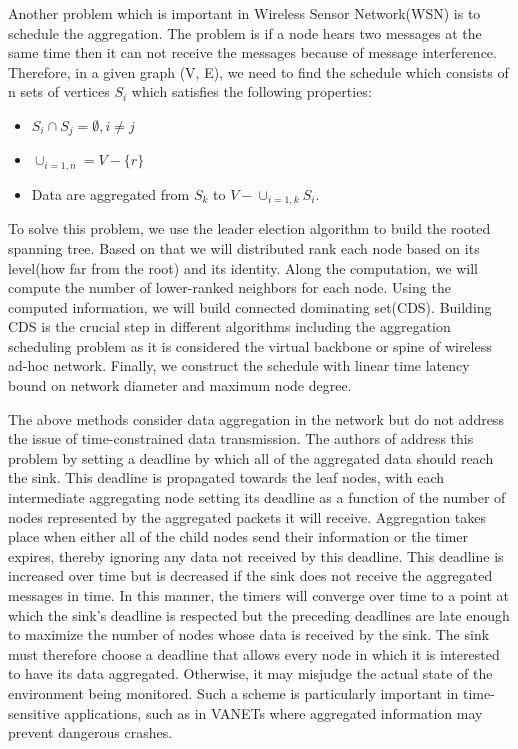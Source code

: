 \documentclass{IEEEtran}
\begin{document}
Another problem which is important in Wireless Sensor Network(WSN) is to schedule the aggregation\cite{DDAS}. The problem is if a node hears two messages at the same time then it can not receive the messages because of message interference. Therefore, in a given graph (V, E), we need to find the schedule which consists of n sets of vertices $S_i$ which satisfies the following properties:
\begin{itemize}
\item $S_i \cap S_j = \emptyset, i \neq j$
\item $\cup_{i=1,n} = V - \{r\}$
\item Data are aggregated from $S_k$ to $V - \cup_{i=1,k}S_i$.
\end{itemize}
To solve this problem, we use the leader election \cite{LeaderElection} algorithm to build the rooted spanning tree. Based on that we will distributed rank each node based on its level(how far from the root) and its identity. Along the computation, we will compute the number of lower-ranked neighbors for each node. Using the computed information, we will build connected dominating set(CDS)\cite{CDS}.
Building CDS is the crucial step in different algorithms including the aggregation scheduling problem as it is considered the virtual backbone or spine of wireless ad-hoc network. Finally, we construct the schedule with linear time latency bound on network diameter and maximum node degree.

The above methods consider data aggregation in the network but do not address the issue of time-constrained data transmission.  The authors of \cite{time} address this problem by setting a deadline by which all of the aggregated data should reach the sink.  This deadline is propagated towards the leaf nodes, with each intermediate aggregating node setting its deadline as a function of the number of nodes represented by the aggregated packets it will receive.
Aggregation takes place when either all of the child nodes send their information or the timer expires, thereby ignoring any data not received by this deadline.  This deadline is increased over time but is decreased if the sink does not receive the aggregated messages in time.  In this manner, the timers will converge over time to a point at which the sink’s deadline is respected but the preceding deadlines are late enough to maximize the number of nodes whose data is received by the sink.
The sink must therefore choose a deadline that allows every node in which it is interested to have its data aggregated.  Otherwise, it may misjudge the actual state of the environment being monitored.  Such a scheme is particularly important in time-sensitive applications, such as in VANETs where aggregated information may prevent dangerous crashes.
\end{document}

